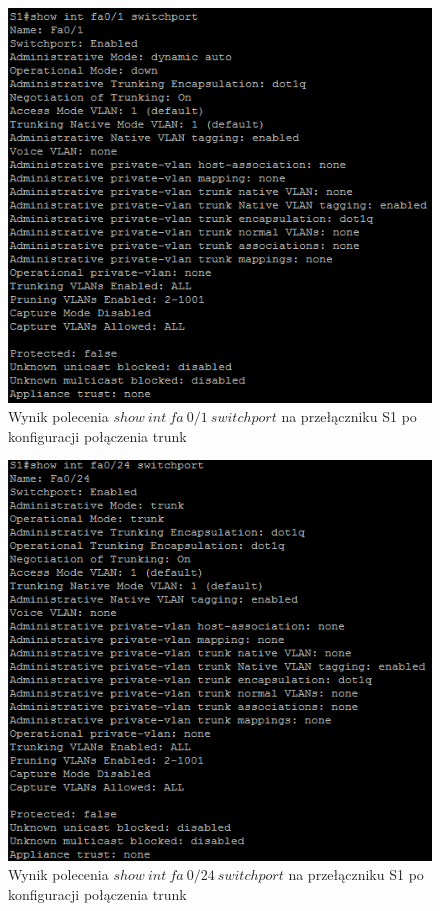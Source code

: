 \documentclass[wide,a4paper,titlepage,12pt] {article}
\begin{document}
  \begin{figure}[htbp]
    \begin{center}
      \includegraphics[width=\textwidth]{img/t10.PNG}
      \caption{Wynik polecenia $show\ int\ fa\ 0/1\ switchport$ na przełączniku S1 po konfiguracji połączenia trunk}
    \end{center}
  \end{figure}

  \begin{figure}[htbp]
    \begin{center}
      \includegraphics[width=\textwidth]{img/t11.PNG}
      \caption{Wynik polecenia $show\ int\ fa\ 0/24\ switchport$ na przełączniku S1 po konfiguracji połączenia trunk}
    \end{center}
  \end{figure}
\end{document}
